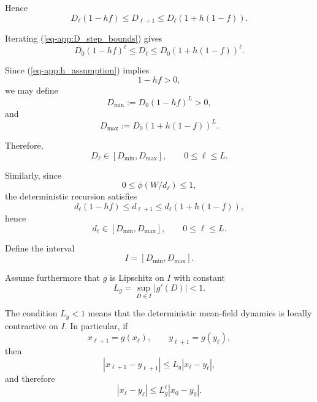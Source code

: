 \documentclass[10pt]{iopart}
\newcommand{\1}{\mathbf{1}}
\begin{document}
Hence
\begin{equation}
D_\ell(1-hf)
\le
D_{\ell+1}
\le
D_\ell(1+h(1-f)).
\label{eq-app:D_step_bounds}
\end{equation}

Iterating (\ref{eq-app:D_step_bounds}) gives
\begin{equation}
D_0(1-hf)^\ell
\le
D_\ell
\le
D_0(1+h(1-f))^\ell.
\label{eq-app:D_global_bounds}
\end{equation}

Since (\ref{eq-app:h_assumption}) implies
\begin{equation}
1-hf>0,
\label{eq-app:positive_factor}
\end{equation}
we may define
\begin{equation}
D_{\min}
:=
D_0(1-hf)^L
>0,
\label{eq-app:Dmin}
\end{equation}
and
\begin{equation}
D_{\max}
:=
D_0(1+h(1-f))^L.
\label{eq-app:Dmax}
\end{equation}

Therefore,
\begin{equation}
D_\ell\in[D_{\min},D_{\max}],
\qquad
0\le \ell\le L.
\label{eq-app:D_interval}
\end{equation}

Similarly, since
\begin{equation}
0\le \phi(W/d_\ell)\le 1,
\label{eq-app:phi_bounds}
\end{equation}
the deterministic recursion satisfies
\begin{equation}
d_\ell(1-hf)
\le
d_{\ell+1}
\le
d_\ell(1+h(1-f)),
\label{eq-app:d_step_bounds}
\end{equation}
hence
\begin{equation}
d_\ell\in[D_{\min},D_{\max}],
\qquad
0\le \ell\le L.
\label{eq-app:d_interval}
\end{equation}

Define the interval
\begin{equation}
I=[D_{\min},D_{\max}].
\label{eq-app:I_def}
\end{equation}

Assume furthermore that $g$ is Lipschitz on $I$ with constant
\begin{equation}
L_g
=
\sup_{D\in I}|g'(D)|
<
1.
\label{eq-app:Lg_assumption}
\end{equation}

The condition $L_g<1$ means that the deterministic mean-field dynamics is locally contractive on $I$. In particular, if
\begin{equation}
x_{\ell+1}=g(x_\ell),
\qquad
y_{\ell+1}=g(y_\ell),
\label{eq-app:two_traj}
\end{equation}
then
\begin{equation}
|x_{\ell+1}-y_{\ell+1}|
\le
L_g|x_\ell-y_\ell|,
\label{eq-app:contraction}
\end{equation}
and therefore
\begin{equation}
|x_\ell-y_\ell|
\le
L_g^\ell |x_0-y_0|.
\label{eq-app:geom_decay}
\end{equation}
\end{document}
